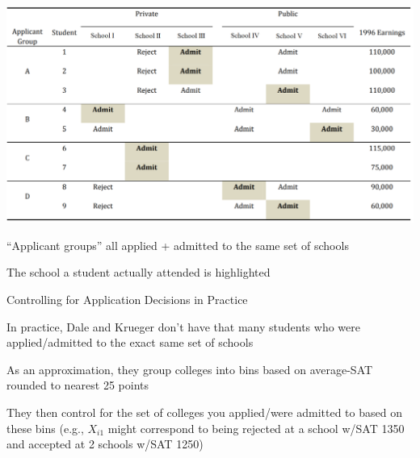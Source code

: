 \documentclass[11pt,english,handout]{beamer}
\newenvironment{wideitemize}{\itemize\addtolength{\itemsep}{10pt}}{\enditemize}
\begin{document}
\begin{frame}
	\centering
	\includegraphics[width = 0.9 \linewidth]{dk-example-applicants}
	\vspace{0.4cm}

	\begin{wideitemize}
		\item
		``Applicant groups'' all applied + admitted to the same set of schools
		
		\item
		The school a student actually attended is highlighted
	\end{wideitemize}
\end{frame}


\begin{frame}{Controlling for Application Decisions in Practice}
	
	
	\begin{wideitemize}
		\item
		In practice, Dale and Krueger don't have that many students who were applied/admitted to the exact same set of schools
		
		\pause
		\item
		As an approximation, they group colleges into bins based on average-SAT rounded to nearest 25 points
		
		\pause
		\item
		They then control for the set of colleges you applied/were admitted to based on these bins (e.g.,  $X_{i1}$ might correspond to being rejected at a school w/SAT 1350 and accepted at 2 schools w/SAT 1250)
		
	\end{wideitemize}
	
\end{frame}
\end{document}
